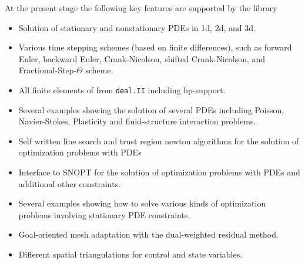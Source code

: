 \documentclass[prodmode,acmtoms]{acmsmall}
\numberwithin{equation}{section}
\newcommand{\deal}{\texttt{deal.II}}
\newcommand{\dope}{\texttt{DOpElib}}
\begin{document}
%

At the present stage the following key features are supported by the library
\begin{itemize}
\item Solution of stationary and nonstationary PDEs in 1d, 2d, and 3d.
\item Various time stepping schemes (based on finite differences), 
  such as forward Euler, backward Euler,
  Crank-Nicolson, shifted Crank-Nicolson, and Fractional-Step-$\Theta$ scheme.
\item All finite elements of from \deal{} including hp-support.
\item Several examples showing the solution of several PDEs including
   Poisson, Navier-Stokes, Plasticity and fluid-structure interaction problems. 
\item Self written line search and trust region newton algorithms for the 
   solution of optimization problems with PDEs \cite{NoWr00}
\item Interface to SNOPT for the solution of optimization problems with PDEs and
  additional other constraints.
\item Several examples showing how to solve various kinds of optimization problems
  involving stationary PDE constraints.
\item Goal-oriented mesh adaptation with the dual-weighted residual method.
\item Different spatial triangulations for control and state variables.
\end{itemize}
\end{document}

